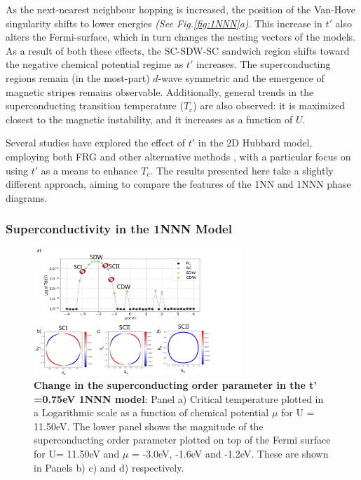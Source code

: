 \documentclass[11pt]{article}
\begin{document}
\noindent
As the next-nearest neighbour hopping is increased, the position of the Van-Hove singularity shifts to lower energies \textit{(See Fig.\ref{fig:1NNN}a)}. 
This increase in $t'$ also alters the Fermi-surface, which in turn changes the nesting vectors of the models. 
As a result of both these effects, the SC-SDW-SC sandwich 
region shifts toward the negative chemical potential regime as $t'$ increases.
The superconducting regions remain (in the most-part) $d$-wave symmetric and the emergence of 
magnetic stripes remains observable. Additionally, general trends in the superconducting transition
temperature ($T_c$) are also observed: it is maximized closest to the 
magnetic instability, and it increases as a function of $U$.\par
\medskip
\noindent Several studies have explored the effect of $t'$ in the 2D Hubbard model, 
employing both FRG \cite{husemann2012incommensurate} and other alternative methods \cite{fontenele2025effects}, 
with a particular focus on using $t'$ as a means to enhance $T_c$. The results presented here take a slightly different approach, aiming to 
compare the features of the 1NN and 1NNN phase diagrams.



\subsubsection{Superconductivity in the 1NNN Model}
\label{subsubsec:SC1NNN}

\begin{figure}[htbp]  %
    \centering
    \includegraphics[width=0.70\textwidth]{1NNNSC_075.png}  %
    \caption{\textbf{Change in the superconducting order parameter in the t' =0.75eV 1NNN model}: Panel a) Critical temperature plotted in a Logarithmic scale
    as a function of chemical potential $\mu$ for U = 11.50eV.
    The lower panel shows the magnitude of the superconducting order parameter plotted on top of the Fermi surface for U= 11.50eV and $\mu$ = -3.0eV, -1.6eV and -1.2eV. These are shown in Panels b)
    c) and d) respectively.  }
    \label{fig:1NNNSC}
\end{figure}
\end{document}
